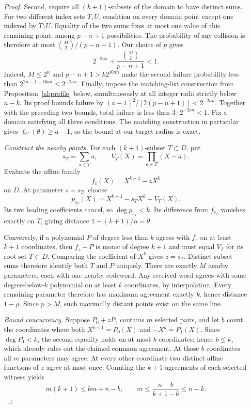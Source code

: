 \documentclass[11pt,letterpaper]{article}
\theoremstyle{definition}
\theoremstyle{remark}
\begin{document}
\begin{proof}
Second, require all $(k+1)$-subsets of the domain to have distinct sums.
For two different index sets $T,U$, condition on every domain point
except one indexed by $T\setminus U$. Equality of the two sums fixes
at most one value of this remaining point, among $p-n+1$ possibilities.
The probability of any collision is therefore at most
$\binom M2/(p-n+1)$. Our choice of $p$ gives
\[
 2^{-2an}+\frac{\binom M2}{p-n+1}<1.
\]
Indeed, $M\le2^n$ and $p-n+1>k2^{10an}$ make the second
failure probability less than $2^{2n-1-10an}\le2^{-2an}$.
Finally, impose the matching-list construction from
Proposition~\ref{al:profile} below, simultaneously at all integer radii
strictly below $n-k$. Its proof bounds failure by
$(a-1)^2/[2(p-n+1)]<2^{-2an}$.
Together with the preceding two bounds, total failure is less than
$3\cdot2^{-2an}<1$. Fix a domain satisfying all three conditions.
The matching construction in particular gives
$\ell_C(\theta)\ge a-1$, so the bound at our target radius is exact.

\emph{Construct the nearby points.}
For each $(k+1)$-subset $T\subset D$, put
\[
 s_T=\sum_{a\in T}a,
 \qquad V_T(X)=\prod_{a\in T}(X-a).
\]
Evaluate the affine family
\[
 f_z(X)=X^{k+1}-zX^k
\]
on $D$. At parameter $z=s_T$, choose
\[
 p_{s_T}(X)=X^{k+1}-s_TX^k-V_T(X).
\]
Its two leading coefficients cancel, so $\deg p_{s_T}<k$.
Its difference from $f_{s_T}$ vanishes exactly on $T$, giving distance
$1-(k+1)/n=\theta$.

Conversely, if a polynomial $P$ of degree less than $k$ agrees with
$f_z$ on at least $k+1$ coordinates, then $f_z-P$ is monic of degree
$k+1$ and must equal $V_T$ for its root set $T\subset D$.
Comparing the coefficient of $X^k$ gives $z=s_T$. Distinct subset sums
therefore identify both $T$ and $P$ uniquely. There are exactly $M$
nearby parameters, each with one nearby codeword. Any received word
agrees with some degree-below-$k$ polynomial on at least $k$ coordinates,
by interpolation. Every remaining parameter therefore has maximum
agreement exactly $k$, hence distance $1-\rho$. Since $p>M$, such
maximally distant points exist on the same line.

\emph{Bound concurrency.}
Suppose $P_0+zP_1$ contains $m$ selected pairs, and let $b$ count the
coordinates where both $X^{k+1}=P_0(X)$ and $-X^k=P_1(X)$.
Since $\deg P_1<k$, the second equality holds on at most $k$ coordinates;
hence $b\le k$, which already rules out the claimed common agreement.
At those $b$ coordinates all $m$ parameters may agree. At every other
coordinate two distinct affine functions of $z$ agree at most once.
Counting the $k+1$ agreements of each selected witness yields
\[
 m(k+1)\le bm+n-b,
 \qquad
 m\le\frac{n-b}{k+1-b}\le n-k.
\]


\end{proof}
\end{document}
